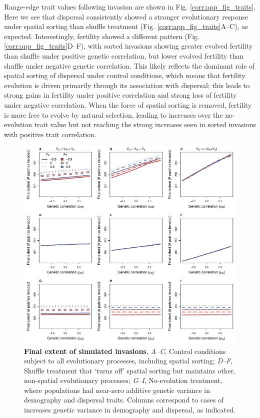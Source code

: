 \documentclass[11pt]{article}
\begin{document}
Range-edge trait values following invasion are shown in Fig. \ref{corr:app_fig_traits}. 
Here we see that dispersal  consistently showed a stronger evolutionary response under spatial sorting than shuffle treatment (Fig. \ref{corr:app_fig_traits}A--C), as expected. Interestingly, fertility showed a different pattern (Fig. \ref{corr:app_fig_traits}D--F), with sorted invasions showing greater evolved fertility than shuffle under positive genetic correlation, but lower evolved fertility than shuffle under negative genetic correlation. 
This likely reflects the dominant role of spatial sorting of dispersal under control conditions, which means that fertility evolution is driven primarily through its association with dispersal; this leads to strong gains in fertility under positive correlation and strong loss of fertility under negative correlation. 
When the force of spatial sorting is removed, fertility is more free to evolve by natural selection, leading to increases over the no-evolution trait value but not reaching the strong increases seen in sorted invasions with positive trait correlation. 

\renewcommand{\thefigure}{A\arabic{figure}}
\setcounter{figure}{0}
\newpage{}
\begin{figure}[h!]
\centering
\includegraphics[width=1\linewidth]{Figures/app_fig_extent}
\caption{\textbf{Final extent of simulated invasions.} \textit{A--C}, Control conditions subject to all evolutionary processes, including spatial sorting; \textit{D--F}, Shuffle treatment that `turns off' spatial sorting but maintains other, non-spatial evolutionary processes; \textit{G--I}, No-evolution treatment, where populations had near-zero additive genetic variance in demography and dispersal traits. Columns correspond to cases of increases genetic variance in demography and dispersal, as indicated.}
\label{corr:app_fig_extent}
\end{figure}
\end{document}
